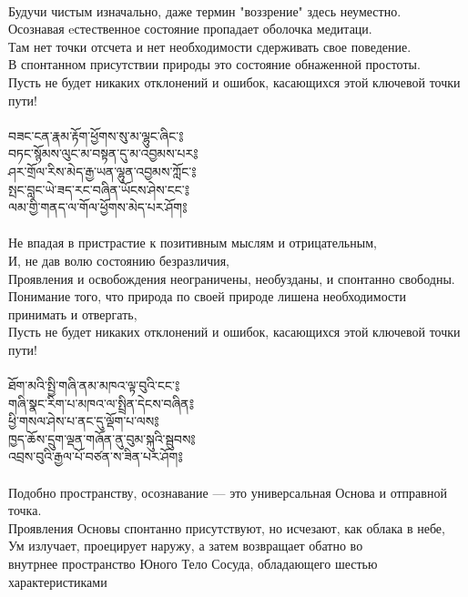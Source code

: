 \\
\ru
Будучи чистым изначально, даже термин "воззрение" здесь неуместно.\\
Осознавая eстественное состояние пропадает оболочка медитаци.\\
Там нет точки отсчета и нет необходимости сдерживать свое поведение.\\
В спонтанном присутствии природы это состояние обнаженной простоты.\\
Пусть не будет никаких отклонений и ошибок, касающихся этой ключевой точки пути!\\
\\
\newpage
{\ti བཟང་ངན་རྣམ་རྟོག་ཕྱོགས་སུ་མ་ལྷུང་ཞིང༌༔\\
བཏང་སྙོམས་ལུང་མ་བསྟན་དུ་མ་འབྱམས་པར༔\\
ཤར་གྲོལ་རིས་མེད་རྒྱ་ཡན་ལྷུན་འབྱམས་ཀློང༌༔\\
སྤང་བླང་ཡེ་ཟད་རང་བཞིན་ཡོངས་ཤེས་ངང༌༔\\
ལམ་གྱི་གནད་ལ་གོལ་ཕྱོགས་མེད་པར་ཤོག༔}\\
\\
\ru
Не впадая в пристрастие к позитивным мыслям и отрицательным,\\
И, не дав волю состоянию безразличия,\\
Проявления и освобождения неограничены, необузданы, и спонтанно свободны.\\
Понимание того, что природа по своей природе лишена необходимости принимать и отвергать,\\
Пусть не будет никаких отклонений и ошибок, касающихся этой ключевой точки пути!\\
\\
{\ti ཐོག་མའི་སྤྱི་གཞི་ནམ་མཁའ་ལྟ་བུའི་ངང༌༔\\
གཞི་སྣང་རིག་པ་མཁའ་ལ་སྤྲིན་དེངས་བཞིན༔\\
ཕྱི་གསལ་ཤེས་པ་ནང་དུ་ལྡོག་པ་ལས༔\\
ཁྱད་ཆོས་དྲུག་ལྡན་གཞོན་ནུ་བུམ་སྐུའི་སྦུབས༔\\
འབྲས་བུའི་རྒྱལ་པོ་བཙན་ས་ཟིན་པར་ཤོག༔}\\
\\
\ru
Подобно пространству, осознавание — это универсальная Основа и отправной точка.\\
Проявления Основы спонтанно присутствуют, но исчезают, как облака в небе,\\
Ум излучает, проецирует наружу, а затем возвращает обатно во\\
внутрнее пространство Юного Тело Сосуда, обладающего шестью характеристиками\\
